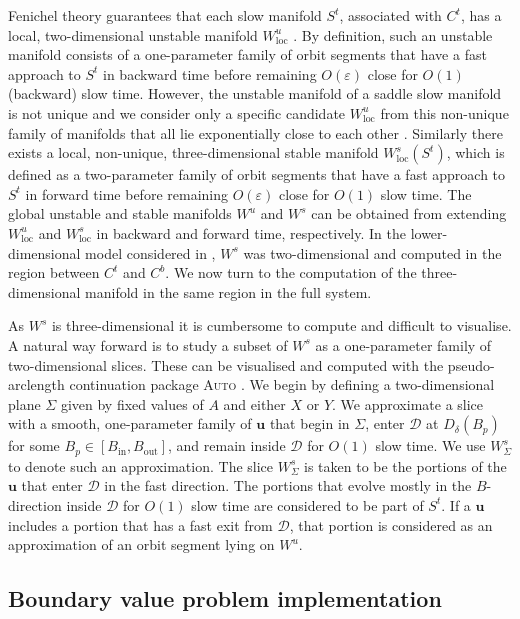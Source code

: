 \documentclass{ws-ijbc}
\begin{document}
Fenichel theory guarantees that each slow manifold $S^t$, associated with $C^t$, has a local, two-dimensional unstable manifold $W_{\mathrm{loc}}^u$ \cite{Fenichel}.  By definition, such an unstable manifold consists of a one-parameter family of orbit segments that have a fast approach to $S^t$ in backward time before remaining $O(\varepsilon)$ close for $O(1)$ (backward) slow time.  However, the unstable manifold of a saddle slow manifold is not unique and we consider only a specific candidate $W_{\mathrm{loc}}^u$ from this non-unique family of manifolds that all lie exponentially close to each other \cite{Fenichel}.  Similarly there exists a local, non-unique, three-dimensional stable manifold $W^s_{\mathrm{loc}}(S^t)$, which is defined as a two-parameter family of orbit segments that have a fast approach to $S^t$ in forward time before remaining $O(\varepsilon)$ close for $O(1)$ slow time.  The global unstable and stable manifolds $W^u$ and $W^s$ can be obtained from extending $W^u_{\mathrm{loc}}$ and $W^s_{\mathrm{loc}}$ in backward and forward time, respectively.  In the lower-dimensional model considered in \cite{QSSA}, $W^s$ was two-dimensional and computed in the region between $C^t$ and $C^b$.  We now turn to the computation of the three-dimensional manifold in the same region in the full system.
    
As $W^s$ is three-dimensional it is cumbersome to compute and difficult to visualise.  A natural way forward is to study a subset of $W^s$ as a one-parameter family of two-dimensional slices.  These can be visualised and computed with the pseudo-arclength continuation package \textsc{Auto} \cite{AUTO}.  We begin by defining a two-dimensional plane $\Sigma$ given by fixed values of $A$ and either $X$ or $Y$.  We approximate a slice with a smooth, one-parameter family of $\mathbf{u}$ that begin in $\Sigma$, enter $\mathscr{D}$ at $D_{\delta}(B_p)$ for some $B_p \in [B_{\text{in}}, B_{\text{out}}]$, and remain inside $\mathscr{D}$ for $O(1)$ slow time.  We use $W^{s}_{\Sigma}$ to denote such an approximation.  The slice $W^{s}_{\Sigma}$ is taken to be the portions of the $\mathbf{u}$ that enter $\mathscr{D}$ in the fast direction.  The portions that evolve mostly in the $B$-direction inside $\mathscr{D}$ for $O(1)$ slow time are considered to be part of $S^t$.  If a $\mathbf{u}$ includes a portion that has a fast exit from $\mathscr{D}$, that portion is considered as an approximation of an orbit segment lying on $W^u$.
    
\subsection{Boundary value problem implementation}
\end{document}
